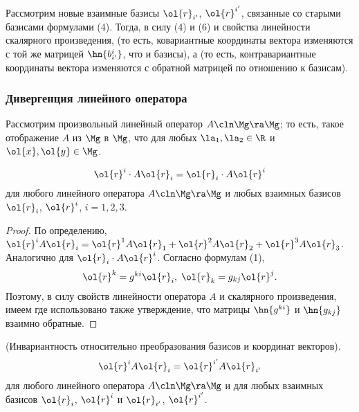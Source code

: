 \documentclass[a4paper]{article}
\begin{document}
Рассмотрим новые взаимные базисы $\ol{r}_{i'}$, $\ol{r}^{i'}$,
связанные со старыми базисами формулами (4). Тогда, в силу (4) и (6)
и свойства линейности скалярного произведения,  (то есть, ковариантные координаты вектора
изменяются с той же матрицей $\hn{b^i_{i'}}$, что и базисы), а
 (то есть, контравариантные
координаты вектора изменяются с обратной матрицей по отношению к
базисам).

\subsubsection{Дивергенция линейного оператора}

Рассмотрим произвольный линейный оператор $A\cln \Mg\ra\Mg$; то
есть, такое отображение $A$ из $\Mg$ в $\Mg$, что  для любых
$\la_1,\la_2\in\R$ и $\ol{x},\ol{y}\in\Mg$.

\begin{theorem}
\label{thm141'}
$$\ol{r}^i\cdot A\ol{r}_i = \ol{r}_i\cdot A\ol{r}^i$$ для любого
линейного оператора $A\cln\Mg\ra\Mg$ и любых взаимных базисов
$\ol{r}_i$, $\ol{r}^i$, $i=1,2,3$.
\end{theorem}

\begin{proof}
По определению, $\ol{r}^i A\ol{r}_i = \ol{r}^1 A\ol{r}_1 + \ol{r}^2
A \ol{r}_2 + \ol{r}^3 A\ol{r}_3$. Аналогично для $\ol{r}_i\cdot
A\ol{r}^i$. Согласно формулам (1), $$\ol{r}^k=g^{ki}\ol{r}_i, \;
\ol{r}_k=g_{kj} \ol{r}^j.$$ Поэтому, в силу свойств линейности
оператора $A$ и скалярного произведения, имеем  где использовано также утверждение, что матрицы
$\hn{g^{ki}}$ и $\hn{g_{kj}}$ взаимно обратные.
\end{proof}

\begin{theorem}
\label{thm142'} (Инвариантность относительно преобразования базисов
и координат векторов). $$\ol{r}^i A \ol{r}_i = \ol{r}^{i'} A
\ol{r}_{i'}$$ для любого линейного оператора $A\cln\Mg\ra\Mg$ и для
любых взаимных базисов $\ol{r}_i$, $\ol{r}^i$ и $\ol{r}_{i'}$,
$\ol{r}^{i'}$.
\end{theorem}
\end{document}
